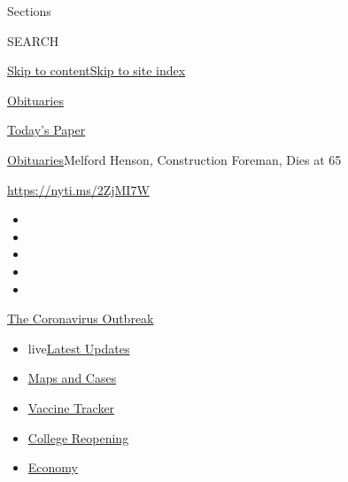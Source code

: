 Sections

SEARCH

\protect\hyperlink{site-content}{Skip to
content}\protect\hyperlink{site-index}{Skip to site index}

\href{https://www.nytimes.com/section/obituaries}{Obituaries}

\href{https://myaccount.nytimes.com/auth/login?response_type=cookie\&client_id=vi}{}

\href{https://www.nytimes.com/section/todayspaper}{Today's Paper}

\href{/section/obituaries}{Obituaries}\textbar{}Melford Henson,
Construction Foreman, Dies at 65

\url{https://nyti.ms/2ZjMI7W}

\begin{itemize}
\item
\item
\item
\item
\item
\end{itemize}

\href{https://www.nytimes.com/news-event/coronavirus?action=click\&pgtype=Article\&state=default\&region=TOP_BANNER\&context=storylines_menu}{The
Coronavirus Outbreak}

\begin{itemize}
\tightlist
\item
  live\href{https://www.nytimes.com/2020/08/03/world/coronavirus-covid-19.html?action=click\&pgtype=Article\&state=default\&region=TOP_BANNER\&context=storylines_menu}{Latest
  Updates}
\item
  \href{https://www.nytimes.com/interactive/2020/us/coronavirus-us-cases.html?action=click\&pgtype=Article\&state=default\&region=TOP_BANNER\&context=storylines_menu}{Maps
  and Cases}
\item
  \href{https://www.nytimes.com/interactive/2020/science/coronavirus-vaccine-tracker.html?action=click\&pgtype=Article\&state=default\&region=TOP_BANNER\&context=storylines_menu}{Vaccine
  Tracker}
\item
  \href{https://www.nytimes.com/2020/08/02/us/covid-college-reopening.html?action=click\&pgtype=Article\&state=default\&region=TOP_BANNER\&context=storylines_menu}{College
  Reopening}
\item
  \href{https://www.nytimes.com/live/2020/08/03/business/stock-market-today-coronavirus?action=click\&pgtype=Article\&state=default\&region=TOP_BANNER\&context=storylines_menu}{Economy}
\end{itemize}

